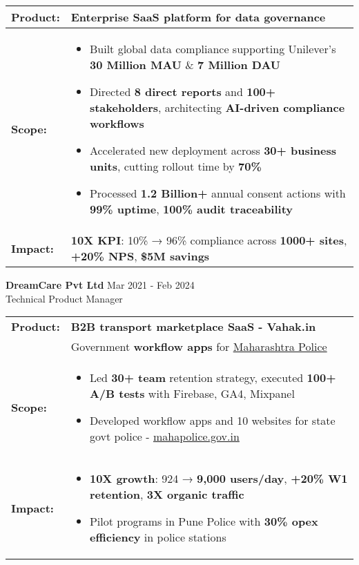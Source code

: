 \documentclass[10pt,a4paper]{article}
\newcommand{\experienceitem}[4]{
    #1 \hfill #2 \\
    #3 \hfill \textit{#4}
}
\begin{document}
{\renewcommand{\arraystretch}{1.2}
\begin{tabularx}{\textwidth}{|>{\raggedright\arraybackslash}p{1.8cm}|X|}
\hline
\textbf{Product:} & \textbf{Enterprise SaaS} platform for \textbf{data governance} \\ \hline
\textbf{Scope:} & \begin{itemize}[leftmargin=*,nosep]
    \item Built global data compliance supporting Unilever’s \textbf{30 Million MAU} \& \textbf{7 Million DAU}
    \item Directed \textbf{8 direct reports} and \textbf{100+ stakeholders}, architecting \textbf{AI-driven compliance workflows}
    \item Accelerated new deployment across \textbf{30+ business units}, cutting rollout time by \textbf{70\%}
    \item Processed \textbf{1.2 Billion+} annual consent actions with \textbf{99\% uptime}, \textbf{100\% audit traceability}
\end{itemize} \\ \hline
\textbf{Impact:} & \textbf{10X KPI}: 10\% → 96\% compliance across \textbf{1000+ sites}, \textbf{+20\% NPS}, \textbf{\$5M savings} \\ \hline
\end{tabularx}}
\vspace{6pt}

\experienceitem{\textbf{DreamCare Pvt Ltd}}{Mar 2021 - Feb 2024}{Technical Product Manager}{}

{\renewcommand{\arraystretch}{1.2}
\begin{tabularx}{\textwidth}{|>{\raggedright\arraybackslash}p{1.8cm}|X|}
\hline
\textbf{Product:} & \textbf{B2B transport marketplace SaaS - Vahak.in } \\ & Government \textbf{workflow apps} for \href{https://www.mahapolice.gov.in/}{\textcolor{blue!70!black}{Maharashtra Police}} \\ \hline
\textbf{Scope:} & \begin{itemize}[leftmargin=*,nosep]
    \item Led \textbf{30+ team} retention strategy, executed \textbf{100+ A/B tests} with Firebase, GA4, Mixpanel
    \item Developed workflow apps and 10 websites for state govt police - \href{https://www.mahapolice.gov.in/}{\textcolor{blue!70!black}{mahapolice.gov.in}}
\end{itemize} \\ \hline
\textbf{Impact:} & \begin{itemize}[leftmargin=*,nosep]
    \item \textbf{10X growth}: 924 → \textbf{9,000 users/day}, \textbf{+20\% W1 retention}, \textbf{3X organic traffic}
    \item Pilot programs in Pune Police with \textbf{30\% opex efficiency} in police stations
\end{itemize} \\ \hline
\end{tabularx}}
\vspace{6pt}
\end{document}
